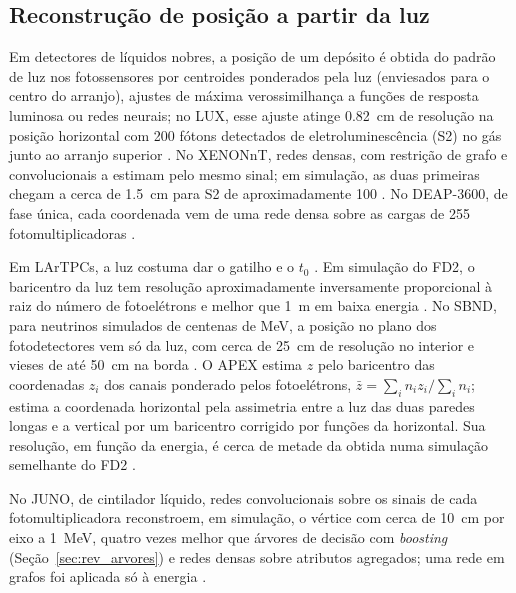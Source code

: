 \label{sec:revisao}

\subsection{Reconstrução de posição a partir da luz}
\label{sec:rev_luz}

Em detectores de líquidos nobres, a posição de um depósito é obtida do padrão de luz nos fotossensores por centroides ponderados pela luz (enviesados para o centro do arranjo), ajustes de máxima verossimilhança a funções de resposta luminosa ou redes neurais; no LUX, esse ajuste atinge \qty{0.82}{\cm} de resolução na posição horizontal com \num{200} fótons detectados de eletroluminescência (S2) no gás junto ao arranjo superior \cite{akerib2018position}. No XENONnT, redes densas, com restrição de grafo e convolucionais a estimam pelo mesmo sinal; em simulação, as duas primeiras chegam a cerca de \qty{1.5}{\cm} para S2 de aproximadamente \qty{100}{\pe} \cite{aprile2025xenonnt}. No DEAP-3600, de fase única, cada coordenada vem de uma rede densa sobre as cargas de \num{255} fotomultiplicadoras \cite{adhikari2025position}.

Em LArTPCs, a luz costuma dar o gatilho e o $t_0$ \cite{abratenko2024scintillation, paulucci2022dune}. Em simulação do FD2, o baricentro da luz tem resolução aproximadamente inversamente proporcional à raiz do número de fotoelétrons e melhor que \qty{1}{\m} em baixa energia \cite{paulucci2022dune}. No SBND, para neutrinos simulados de centenas de MeV, a posição no plano dos fotodetectores vem só da luz, com cerca de \qty{25}{\cm} de resolução no interior e vieses de até \qty{50}{\cm} na borda \cite{abratenko2024scintillation}. O APEX estima $z$ pelo baricentro das coordenadas $z_i$ dos canais ponderado pelos fotoelétrons, $\bar{z} = \sum_i n_i z_i / \sum_i n_i$; estima a coordenada horizontal pela assimetria entre a luz das duas paredes longas e a vertical por um baricentro corrigido por funções da horizontal. Sua resolução, em função da energia, é cerca de metade da obtida numa simulação semelhante do FD2 \cite{marinho2025apex}.

No JUNO, de cintilador líquido, redes convolucionais sobre os sinais de cada fotomultiplicadora reconstroem, em simulação, o vértice com cerca de \qty{10}{\cm} por eixo a \qty{1}{\MeV}, quatro vezes melhor que árvores de decisão com \textit{boosting} (Seção~\ref{sec:rev_arvores}) e redes densas sobre atributos agregados; uma rede em grafos foi aplicada só à energia \cite{qian2021vertex}.

